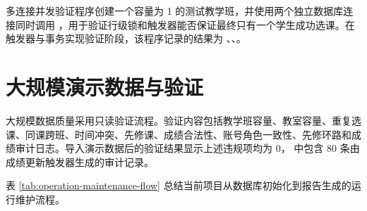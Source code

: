 多连接并发验证程序创建一个容量为 1 的测试教学班，并使用两个独立数据库连接同时调用 ，用于验证行级锁和触发器能否保证最终只有一个学生成功选课。在触发器与事务实现验证阶段，该程序记录的结果为 、、。

\section{大规模演示数据与验证}


大规模数据质量采用只读验证流程。验证内容包括教学班容量、教室容量、重复选课、同课跨班、时间冲突、先修课、成绩合法性、账号角色一致性、先修环路和成绩审计日志。导入演示数据后的验证结果显示上述违规项均为 0， 中包含 80 条由成绩更新触发器生成的审计记录。

表 \ref{tab:operation-maintenance-flow} 总结当前项目从数据库初始化到报告生成的运行维护流程。

